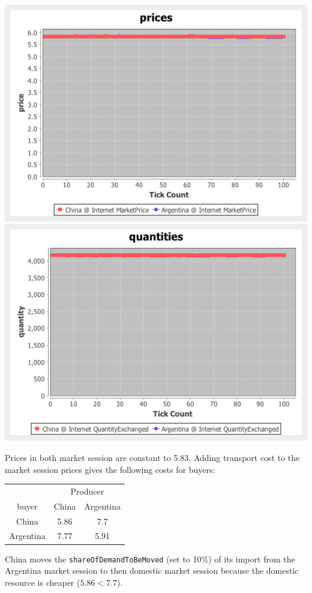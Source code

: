 \documentclass{article}
\begin{document}
\vskip2mm
\hskip-2cm
\includegraphics[scale=0.4]{fig_case1_prices}
\includegraphics[scale=0.4]{fig_case1_quantities}

Prices in both market session are constant to 5.83. Adding transport cost to the market session prices gives the following costs for buyers:

\vskip2mm
\begin{tabular}{c | c  c }
	& \multicolumn{2}{c}{Producer}\\
	buyer & China&Argentina\\
	\hline
	China & 5.86&7.7\\
	\hline
	Argentina & 7.77&5.91\\
	\hline
\end{tabular}

\vskip2mm
China moves the \verb+shareOfDemandToBeMoved+ (set to 10\%) of its import from the Argentina market session to then domestic market session because the domestic resource is cheaper ($5.86<7.7$).
\end{document}
